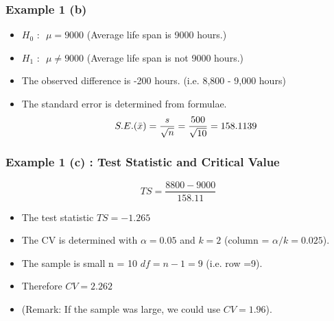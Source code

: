 \begin{frame}
\frametitle{Example 1 (b) }
\large
\begin{itemize}
\item $H_0 \mbox{ : } $ $\mu = 9000$ (Average life span is 9000 hours.)
\item $H_1 \mbox{ : } $ $\mu \neq 9000$ (Average life span is not 9000 hours.)
\end{itemize}
\bigskip
\begin{itemize}
\item The observed difference is -200 hours. (i.e. 8,800 - 9,000 hours)
\item The standard error is determined from formulae.
\[ S.E. (\bar{x}) = {s \over \sqrt{n}} = {500 \over \sqrt{10}}  = 158.1139 \]
\end{itemize}
\end{frame}
\begin{frame}[fragile]
\frametitle{Example 1 (c) : Test Statistic and Critical Value }
\large
\[ TS = \frac{8800 - 9000}{158.11} \]
\begin{itemize}
\item The test statistic $TS = -1.265$
\item The CV is determined with $\alpha = 0.05$ and $k = 2$ (column = $\alpha/k=0.025$).
\item The sample is small n = 10 $df = n-1 = 9$ (i.e. row =9).
\item Therefore $CV = 2.262$

\item (Remark: If the sample was large, we could use $CV = 1.96$).

\end{itemize}
\end{frame}

